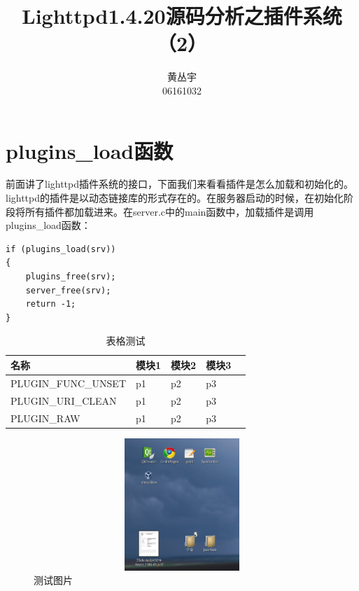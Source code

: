 \documentclass[dvipdfm]{book}
\begin{document}
\title{Lighttpd1.4.20源码分析之插件系统（2）}
\author{黄丛宇\\06161032}
\maketitle

\tableofcontents

\zhkeywords
\zhabstract

\chapter{plugins\_load函数}
前面讲了lighttpd插件系统的接口，下面我们来看看插件是怎么加载和初始化的。lighttpd的插件是以动态链接库的形式存在的。在服务器启动的时候，在初始化阶段将所有插件都加载进来。在server.c中的main函数中，加载插件是调用plugins\_load函数：

\begin{verbatim}
if (plugins_load(srv))
{
	plugins_free(srv);
	server_free(srv);
	return -1;
}
\end{verbatim}


\begin{table}[htbp]
\caption{表格测试}
\centering
\begin{tabularx}{\textwidth}{XXXXl} %
\toprule
\centering 名称 & \centering  模块1 & \centering  模块2 &\centering 模块3&\\
\midrule
\centering PLUGIN\_FUNC\_UNSET &\centering  p1 &\centering  p2 &\centering  p3&\\
\centering PLUGIN\_URI\_CLEAN &\centering  p1 &\centering  p2 &\centering  p3&\\
\centering PLUGIN\_RAW &\centering  p1 &\centering  p2 &\centering  p3&\\
\bottomrule
\end{tabularx}
\end{table}

\begin{figure}[htbp]
\centering
\caption{测试图片}
\includegraphics[height=5cm, width=16cm]{test.eps}
\end{figure}
\end{document}
